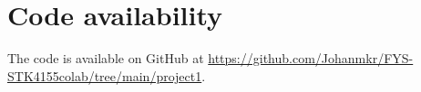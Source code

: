 \maketitle



\tableofcontents





\section*{Code availability}
The code is available on GitHub at \url{https://github.com/Johanmkr/FYS-STK4155colab/tree/main/project1}.

\newpage
\listoffigures





